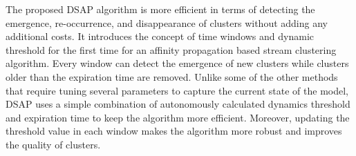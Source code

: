The proposed DSAP algorithm is more efficient in terms of detecting the emergence, re-occurrence, and disappearance of clusters without adding any additional costs. It introduces the concept of time windows and dynamic threshold for the first time for an affinity propagation based stream clustering algorithm. Every window can detect the emergence of new clusters while clusters older than the expiration time are removed. Unlike some of the other methods that require tuning several parameters to capture the current state of the model, DSAP uses a simple combination of autonomously calculated dynamics threshold and expiration time to keep the algorithm more efficient. Moreover, updating the threshold value in each window makes the algorithm more robust and improves the quality of clusters. 


 












